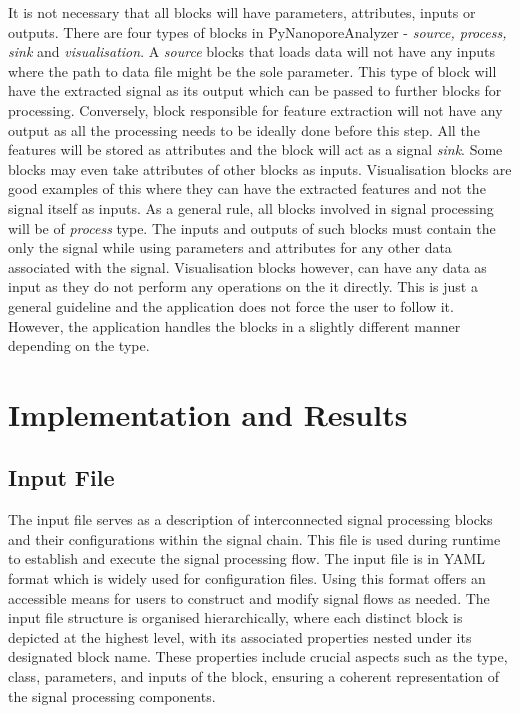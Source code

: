 \documentclass[journal]{IEEEtran}
\begin{document}
It is not necessary that all blocks will have parameters, attributes, inputs or outputs. There are four types of blocks in PyNanoporeAnalyzer - \textit{source, process, sink} and \textit{ visualisation}. A \textit{source} blocks that loads data will not have any inputs where the path to data file might be the sole parameter. This type of block will have the extracted signal as its output which can be passed to further blocks for processing. Conversely, block responsible for feature extraction will not have any output as all the processing needs to be ideally done before this step. All the features will be stored as attributes and the block will act as a signal \textit{sink}. Some blocks may even take attributes of other blocks as inputs. Visualisation blocks are good examples of this where they can have the extracted features and not the signal itself as inputs. As a general rule, all blocks involved in signal processing will be of \textit{process} type. The inputs and outputs of such blocks must contain the only the signal while using parameters and attributes for any other data associated with the signal. Visualisation blocks however, can have any data as input as they do not perform any operations on the it directly. This is just a general guideline and the application does not force the user to follow it. However, the application handles the blocks in a slightly different manner depending on the type.

\section{Implementation and Results}
\subsection{Input File}
The input file serves as a description of interconnected signal processing blocks and their configurations within the signal chain. This file is used during runtime to establish and execute the signal processing flow. The input file is in YAML format which is widely used for configuration files. Using this format offers an accessible means for users to construct and modify signal flows as needed. The input file structure is organised hierarchically, where each distinct block is depicted at the highest level, with its associated properties nested under its designated block name. These properties include crucial aspects such as the type, class, parameters, and inputs of the block, ensuring a coherent representation of the signal processing components. 
\end{document}
